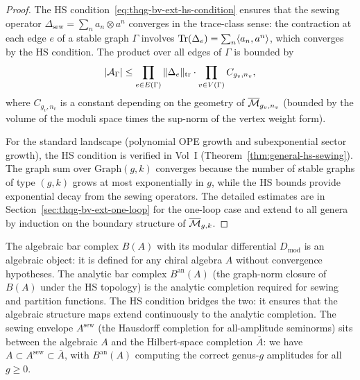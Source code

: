 \begin{proof}
The HS condition~\eqref{eq:thqg-bv-ext-hs-condition} ensures that
the sewing operator $\Delta_{\mathrm{sew}} = \sum_n a_n \otimes
a^n$ converges in the trace-class sense: the contraction at each
edge $e$ of a stable graph $\Gamma$ involves
$\operatorname{Tr}(\Delta_e) = \sum_n \langle a_n, a^n \rangle$, which converges
by the HS condition. The product over all edges of $\Gamma$ is
bounded by
\[
|\mathcal{A}_\Gamma| \le \prod_{e \in E(\Gamma)}
\|\Delta_e\|_{\mathrm{tr}}
\cdot \prod_{v \in V(\Gamma)} C_{g_v, n_v},
\]
where $C_{g_v, n_v}$ is a constant depending on the geometry of
$\overline{\mathcal{M}}_{g_v, n_v}$ (bounded by the volume of the moduli
space times the sup-norm of the vertex weight form).

For the standard landscape (polynomial OPE growth and
subexponential sector growth), the HS condition is verified in
Vol~I (Theorem~\ref{thm:general-hs-sewing}). The
graph sum over $\mathrm{Graph}(g,k)$ converges because the number
of stable graphs of type $(g,k)$ grows at most exponentially in
$g$, while the HS bounds provide exponential decay from the sewing
operators. The detailed estimates are in
Section~\ref{sec:thqg-bv-ext-one-loop} for the one-loop case and
extend to all genera by induction on the boundary structure of
$\overline{\mathcal{M}}_{g,k}$.
\end{proof}

\begin{remark}
The algebraic bar complex $B(A)$ with its modular differential
$D_{\mathrm{mod}}$ is an algebraic object: it is defined for any
chiral algebra $A$ without convergence hypotheses. The analytic
bar complex $B^{\mathrm{an}}(A)$ (the graph-norm closure of $B(A)$
under the HS topology) is the analytic completion required for
sewing and partition functions. The HS condition bridges the two:
it ensures that the algebraic structure maps extend continuously to
the analytic completion. The sewing envelope $A^{\mathrm{sew}}$
(the Hausdorff completion for all-amplitude seminorms) sits between
the algebraic $A$ and the Hilbert-space completion
$\overline{A}$: we have $A \subset A^{\mathrm{sew}} \subset
\overline{A}$, with $B^{\mathrm{an}}(A)$ computing the correct
genus-$g$ amplitudes for all $g \ge 0$.
\end{remark}


